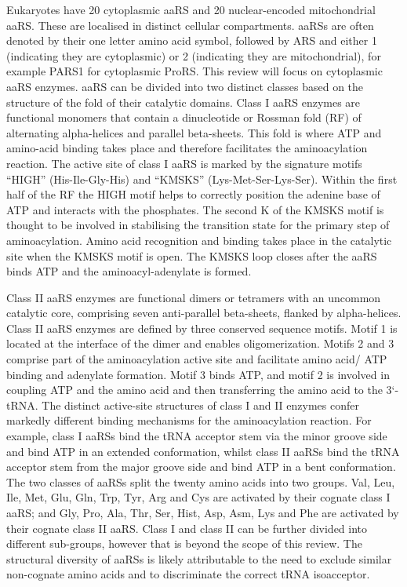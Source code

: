 Eukaryotes have 20 cytoplasmic aaRS and 20 nuclear-encoded mitochondrial aaRS.
These are localised in distinct cellular compartments.
aaRSs are often denoted by their one letter amino acid symbol, followed by ARS and either 1 (indicating they are cytoplasmic) or 2 (indicating they are mitochondrial), for example PARS1 for cytoplasmic ProRS.
This review will focus on cytoplasmic aaRS enzymes.
aaRS can be divided into two distinct classes based on the structure of the fold of their catalytic domains.
Class I aaRS enzymes are functional monomers that contain a dinucleotide or Rossman fold (RF) of alternating alpha-helices and parallel beta-sheets.
This fold is where ATP and amino-acid binding takes place and therefore facilitates the aminoacylation reaction.
The active site of class I aaRS is marked by the signature motifs ``HIGH'' (His-Ile-Gly-His) and ``KMSKS'' (Lys-Met-Ser-Lys-Ser).
Within the first half of the RF the HIGH motif helps to correctly position the adenine base of ATP and interacts with the phosphates.
The second K of the KMSKS motif is thought to be involved in stabilising the transition state for the primary step of aminoacylation\cite{newberry2002structural}.
Amino acid recognition and binding takes place in the catalytic site when the KMSKS motif is open.
The KMSKS loop closes after the aaRS binds ATP and the aminoacyl-adenylate is formed\cite{kwon2019aminoacyl}.

Class II aaRS enzymes are functional dimers or tetramers with an uncommon catalytic core, comprising seven anti-parallel beta-sheets, flanked by alpha-helices.
Class II aaRS enzymes are defined by three conserved sequence motifs.
Motif 1 is located at the interface of the dimer and enables oligomerization.
Motifs 2 and 3 comprise part of the aminoacylation active site and facilitate amino acid/ ATP binding and adenylate formation.
Motif 3 binds ATP, and motif 2 is involved in coupling ATP and the amino acid and then transferring the amino acid to the 3`-tRNA\cite{kwon2019aminoacyl}.
The distinct active-site structures of class I and II enzymes confer markedly different binding mechanisms for the aminoacylation reaction.
For example, class I aaRSs bind the tRNA acceptor stem via the minor groove side and bind ATP in an extended conformation, whilst class II aaRSs bind the tRNA acceptor stem from the major groove side and bind ATP in a bent conformation.
The two classes of aaRSs split the twenty amino acids into two groups.
Val, Leu, Ile, Met, Glu, Gln, Trp, Tyr, Arg and Cys are activated by their cognate class I aaRS; and Gly, Pro, Ala, Thr, Ser, Hist, Asp, Asm, Lys and Phe are activated by their cognate class II aaRS.
Class I and class II can be further divided into different sub-groups, however that is beyond the scope of this review.
The structural diversity of aaRSs is likely attributable to the need to exclude similar non-cognate amino acids and to discriminate the correct tRNA isoacceptor.

